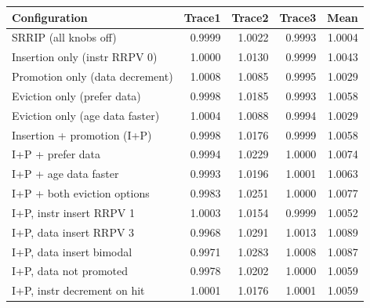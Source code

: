 \begin{tabular}{lrrrr}\toprule
Configuration & Trace1 & Trace2 & Trace3 & Mean \\ \midrule
SRRIP (all knobs off) & 0.9999 & 1.0022 & 0.9993 & 1.0004 \\
Insertion only (instr RRPV 0) & 1.0000 & 1.0130 & 0.9999 & 1.0043 \\
Promotion only (data decrement) & 1.0008 & 1.0085 & 0.9995 & 1.0029 \\
Eviction only (prefer data) & 0.9998 & 1.0185 & 0.9993 & 1.0058 \\
Eviction only (age data faster) & 1.0004 & 1.0088 & 0.9994 & 1.0029 \\
Insertion + promotion (I+P) & 0.9998 & 1.0176 & 0.9999 & 1.0058 \\
I+P + prefer data & 0.9994 & 1.0229 & 1.0000 & 1.0074 \\
I+P + age data faster & 0.9993 & 1.0196 & 1.0001 & 1.0063 \\
I+P + both eviction options & 0.9983 & 1.0251 & 1.0000 & 1.0077 \\
I+P, instr insert RRPV 1 & 1.0003 & 1.0154 & 0.9999 & 1.0052 \\
I+P, data insert RRPV 3 & 0.9968 & 1.0291 & 1.0013 & 1.0089 \\
I+P, data insert bimodal & 0.9971 & 1.0283 & 1.0008 & 1.0087 \\
I+P, data not promoted & 0.9978 & 1.0202 & 1.0000 & 1.0059 \\
I+P, instr decrement on hit & 1.0001 & 1.0176 & 1.0001 & 1.0059 \\
\bottomrule\end{tabular}
